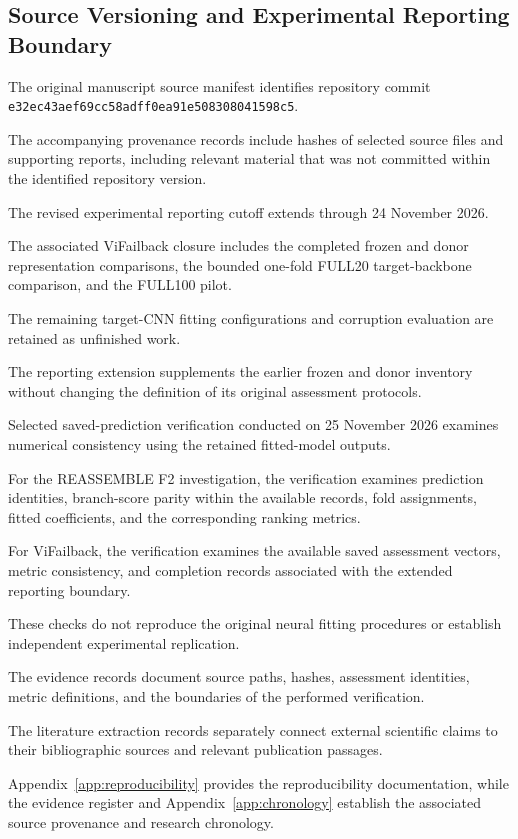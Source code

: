 \subsection{Source Versioning and Experimental Reporting Boundary}

The original manuscript source manifest identifies repository commit \texttt{e32ec43aef69cc58adff0ea91e508308041598c5}.

The accompanying provenance records include hashes of selected source files and supporting reports, including relevant material that was not committed within the identified repository version.

The revised experimental reporting cutoff extends through 24 November 2026.

The associated ViFailback closure includes the completed frozen and donor representation comparisons, the bounded one-fold FULL20 target-backbone comparison, and the FULL100 pilot.

The remaining target-CNN fitting configurations and corruption evaluation are retained as unfinished work.

The reporting extension supplements the earlier frozen and donor inventory without changing the definition of its original assessment protocols.

Selected saved-prediction verification conducted on 25 November 2026 examines numerical consistency using the retained fitted-model outputs.

For the REASSEMBLE F2 investigation, the verification examines prediction identities, branch-score parity within the available records, fold assignments, fitted coefficients, and the corresponding ranking metrics.

For ViFailback, the verification examines the available saved assessment vectors, metric consistency, and completion records associated with the extended reporting boundary.

These checks do not reproduce the original neural fitting procedures or establish independent experimental replication.

The evidence records document source paths, hashes, assessment identities, metric definitions, and the boundaries of the performed verification.

The literature extraction records separately connect external scientific claims to their bibliographic sources and relevant publication passages.

Appendix~\ref{app:reproducibility} provides the reproducibility documentation, while the evidence register and Appendix~\ref{app:chronology} establish the associated source provenance and research chronology.


